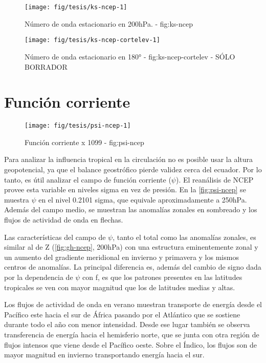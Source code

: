\documentclass[spanish,a4paper]{book}
\begin{document}
\begin{figure*}
\texttt{[image: fig/tesis/ks-ncep-1]} \caption{Número de onda estacionario en 200hPa. - fig:ks-ncep}\label{fig:ks-ncep}
\end{figure*}

\begin{figure*}
\texttt{[image: fig/tesis/ks-ncep-cortelev-1]} \caption{Número de onda estacionario en 180° - fig:ks-ncep-cortelev - SÓLO BORRADOR}\label{fig:ks-ncep-cortelev}
\end{figure*}

\section{Función corriente}\label{funcion-corriente}

\begin{landscape}\begin{figure}

{\centering \texttt{[image: fig/tesis/psi-ncep-1]} 

}

\caption{Función corriente x 1099 - fig:psi-ncep}\label{fig:psi-ncep}
\end{figure}
\end{landscape}

Para analizar la influencia tropical en la circulación no es posible
usar la altura geopotencial, ya que el balance geostrófico pierde
validez cerca del ecuador. Por lo tanto, es útil analizar el campo de
función corriente (\(\psi\)). El reanálisis de NCEP provee esta variable
en niveles sigma en vez de presión. En la \autoref{fig:psi-ncep} se
muestra \(\psi\) en el nivel 0.2101 sigma, que equivale aproximadamente
a 250hPa. Además del campo medio, se muestran las anomalías zonales en
sombreado y los flujos de actividad de onda en flechas.

Las características del campo de \(\psi\), tanto el total como las
anomalías zonales, es similar al de Z (\autoref{fig:gh-ncep}, 200hPa)
con una estructura eminentemente zonal y un aumento del gradiente
meridional en invierno y primavera y los mismos centros de anomalías. La
principal diferencia es, además del cambio de signo dada por la
dependencia de \(\psi\) con f, es que los patrones presentes en las
latitudes tropicales se ven con mayor magnitud que los de latitudes
medias y altas.

Los flujos de actividad de onda en verano muestran transporte de energía
desde el Pacífico este hacia el sur de África pasando por el Atlántico
que se sostiene durante todo el año con menor intensidad. Desde ese
lugar también se observa transferencia de energía hacia el hemisferio
norte, que se junta con otra región de flujos intensos que viene desde
el Pacífico oeste. Sobre el Índico, los flujos son de mayor magnitud en
invierno transportando energía hacia el sur.
\end{document}
